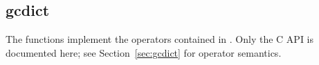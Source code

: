 %
%
%
%
%              

\subsection{gcdict}
\label{gcdict}

The  functions implement the operators contained in
.  Only the C API is documented here; see
Section~\ref{sec:gcdict} for operator semantics.

